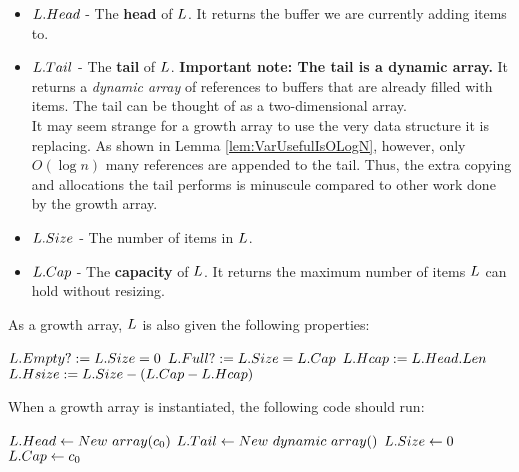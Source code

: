 \begin{itemize}
	\item $L.Head$ - The \textbf{head} of $\VarList$. It returns the buffer we are currently adding items to.
	\item $L.Tail$ - The \textbf{tail} of $\VarList$. \textbf{Important note: The tail is a dynamic array.} It returns a \textit{dynamic array} of references to buffers that are already filled with items. The tail can be thought of as a two-dimensional array.\\
	{\HdrNote} It may seem strange for a growth array to use the very data structure it is replacing. As shown in Lemma \ref{lem:VarUsefulIsOLogN}, however, only $O(\log n)$ many references are appended to the tail. Thus, the extra copying and allocations the tail performs is minuscule compared to other work done by the growth array.
	\item $L.Size$ - The number of items in $\VarList$.
	\item $L.Cap$ - The \textbf{capacity} of $\VarList$. It returns the maximum number of items $\VarList$ can hold without resizing.
\end{itemize}

As a growth array, $\VarList$ is also given the following properties:

\begin{algorithm}
	\begin{algorithmic}
		\State $L.Empty? := L.Size = 0$
		\State
		\State $L.Full? := L.Size = L.Cap$
		\State
		\State $L.Hcap := L.Head.Len$
		\State
		\State $L.Hsize := L.Size - \left(L.Cap - L.Hcap\right)$
	\end{algorithmic}
\end{algorithm}

When a growth array is instantiated, the following code should run:

\begin{algorithm}
	\begin{algorithmic}
		\Procedure{$\FuncConstructor$}{$\VarList$}
			\State $L.Head \gets New\ array(c_0)$
			\State $L.Tail \gets New\ dynamic\ array()$
			\State $L.Size \gets 0$
			\State $L.Cap \gets c_0$
		\EndProcedure
	\end{algorithmic}
\end{algorithm}